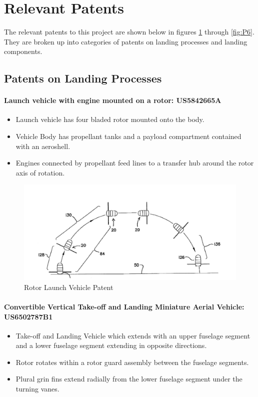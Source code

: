 \section{Relevant Patents}

The relevant patents to this project are shown below in figures \ref{fig:P1} through \ref{fig:P6}. They are broken up into categories of patents on landing processes and landing components.

\subsection{Patents on Landing Processes}

\paragraph{Launch vehicle with engine mounted on a rotor: US5842665A}
\begin{itemize}
    \item Launch vehicle has four bladed rotor mounted onto the body.
    \item Vehicle Body has propellant tanks and a payload compartment contained with an aeroshell.
    \item Engines connected by propellant feed lines to a transfer hub around the rotor axis of rotation.
\end{itemize}

\begin{figure}[H]
    \centering
    \includegraphics{src/figs/Patent1.png}
    \caption{Rotor Launch Vehicle Patent}
    \label{fig:P1}
\end{figure}


\paragraph{Convertible Vertical Take-off and Landing Miniature Aerial Vehicle: US6502787B1}
\begin{itemize}
    \item Take-off and Landing Vehicle which extends with an upper fuselage segment and a lower fuselage segment extending in opposite directions.
    \item Rotor rotates within a rotor guard assembly between the fuselage segments.
    \item Plural grin fins extend radially from the lower fuselage segment under the turning vanes.
\end{itemize}

